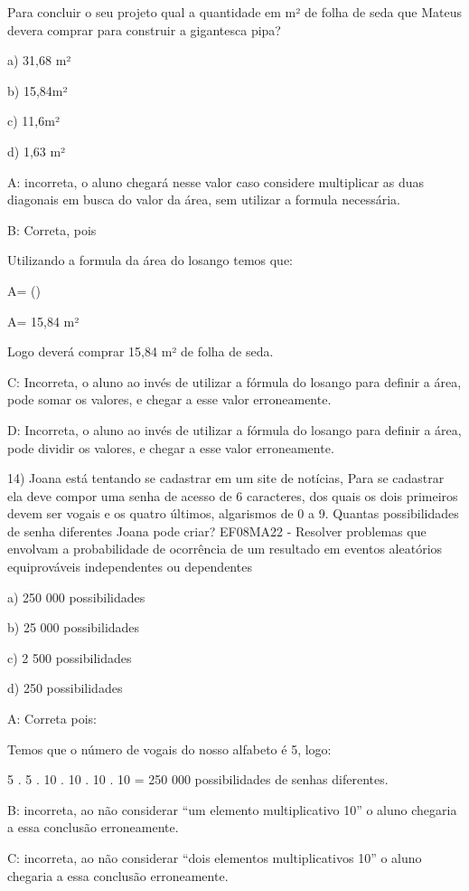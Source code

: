 Para concluir o seu projeto qual a quantidade em m² de folha de seda que
Mateus devera comprar para construir a gigantesca pipa?

a) 31,68 m²

b) 15,84m²

c) 11,6m²

d) 1,63 m²

A: incorreta, o aluno chegará nesse valor caso considere multiplicar as
duas diagonais em busca do valor da área, sem utilizar a formula
necessária.

B: Correta, pois

Utilizando a formula da área do losango temos que:


A= ()

A= 15,84 m²

Logo deverá comprar 15,84 m² de folha de seda.

C: Incorreta, o aluno ao invés de utilizar a fórmula do losango para
definir a área, pode somar os valores, e chegar a esse valor
erroneamente.

D: Incorreta, o aluno ao invés de utilizar a fórmula do losango para
definir a área, pode dividir os valores, e chegar a esse valor
erroneamente.

14) Joana está tentando se cadastrar em um site de notícias, Para se
cadastrar ela deve compor uma senha de acesso de 6 caracteres, dos quais
os dois primeiros devem ser vogais e os quatro últimos, algarismos de 0
a 9. Quantas possibilidades de senha diferentes Joana pode criar?
EF08MA22 - Resolver problemas que envolvam a probabilidade de ocorrência
de um resultado em eventos aleatórios equiprováveis independentes ou
dependentes

a) 250 000 possibilidades

b) 25 000 possibilidades

c) 2 500 possibilidades

d) 250 possibilidades

A: Correta pois:

Temos que o número de vogais do nosso alfabeto é 5, logo:

5 . 5 . 10 . 10 . 10 . 10 = 250 000 possibilidades de senhas diferentes.

B: incorreta, ao não considerar ``um elemento multiplicativo 10'' o
aluno chegaria a essa conclusão erroneamente.

C: incorreta, ao não considerar ``dois elementos multiplicativos 10'' o
aluno chegaria a essa conclusão erroneamente.


